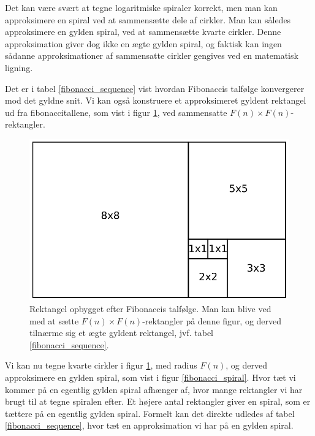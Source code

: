 {Det kan være svært at tegne logaritmiske spiraler korrekt, men man kan
approksimere en spiral ved at sammensætte dele af cirkler. Man kan
således approksimere en gylden spiral, ved at sammensætte kvarte
cirkler.  Denne approksimation giver dog ikke en ægte gylden spiral, og
faktisk kan ingen sådanne approksimationer af sammensatte cirkler
gengives ved en matematisk ligning\cite{Sharp2002}. 

Det er i tabel \ref{fibonacci_sequence} vist hvordan Fibonaccis talfølge
konvergerer mod det gyldne snit. Vi kan også konstruere et approksimeret
gyldent rektangel ud fra fibonaccitallene, som vist i figur
\ref{fibonacci_rektangel}, ved sammensatte $F(n)\times F(n)$-rektangler.

\begin{figure}[t]
    \centering
	\includegraphics[scale=0.35,angle=0]{afsnit/baggrund/billeder/fib_rect}
    \caption[Rektangel opbygget efter Fibonaccis talfølge]{Rektangel
    opbygget efter Fibonaccis talfølge. Man kan blive ved med at sætte
    $F(n)\times F(n)$-rektangler på denne figur, og derved tilnærme sig et
    ægte gyldent rektangel, jvf. tabel \ref{fibonacci_sequence}.}
	\label{fibonacci_rektangel}
\end{figure}

Vi kan nu tegne kvarte cirkler i figur \ref{fibonacci_rektangel}, med
radius $F(n)$, og derved approksimere en gylden spiral, som vist i figur
\ref{fibonacci_spiral}. Hvor tæt vi kommer på en egentlig gylden spiral
afhænger af, hvor mange rektangler vi har brugt til at tegne spiralen
efter. Et højere antal rektangler giver en spiral, som er tættere på en
egentlig gylden spiral. Formelt kan det direkte udledes af tabel
\ref{fibonacci_sequence}, hvor tæt en approksimation vi har på en gylden
spiral.

}
